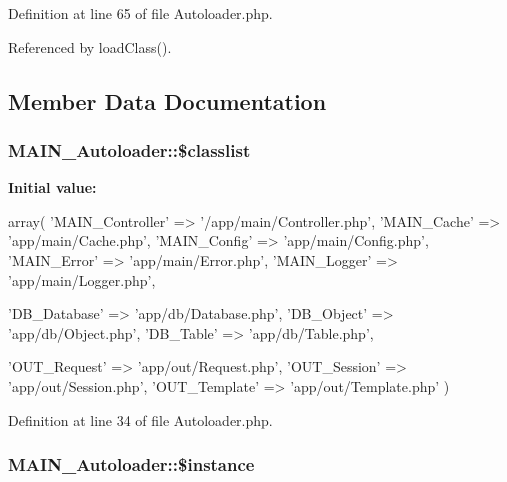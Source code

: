 Definition at line 65 of file Autoloader.php.

Referenced by loadClass().

\subsection{Member Data Documentation}
\hypertarget{classMAIN__Autoloader_a1ba4327fb805ecd48589610463c3a8c4}{
\subsubsection[{\$classlist}]{\setlength{\rightskip}{0pt plus 5cm}MAIN\_\-Autoloader::\$classlist}}
\label{dd/d71/classMAIN__Autoloader_a1ba4327fb805ecd48589610463c3a8c4}
{\bfseries Initial value:}
\begin{DoxyCode}
 array(
                        'MAIN_Controller' => '/app/main/Controller.php',
                        'MAIN_Cache'      => 'app/main/Cache.php',
                        'MAIN_Config'     => 'app/main/Config.php',
                        'MAIN_Error'      => 'app/main/Error.php',
                        'MAIN_Logger'     => 'app/main/Logger.php',

                        'DB_Database'     => 'app/db/Database.php',
                        'DB_Object'       => 'app/db/Object.php',
                        'DB_Table'        => 'app/db/Table.php',

                        'OUT_Request'     => 'app/out/Request.php',
                        'OUT_Session'     => 'app/out/Session.php',
                        'OUT_Template'    => 'app/out/Template.php' )
\end{DoxyCode}


Definition at line 34 of file Autoloader.php.\hypertarget{classMAIN__Autoloader_a00cdc353ce3e2665f86e87e3abb8bf0a}{
\subsubsection[{\$instance}]{\setlength{\rightskip}{0pt plus 5cm}MAIN\_\-Autoloader::\$instance}}
\label{dd/d71/classMAIN__Autoloader_a00cdc353ce3e2665f86e87e3abb8bf0a}


